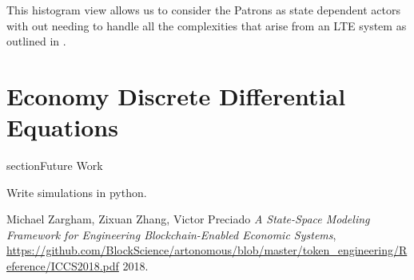 \documentclass[11pt]{amsart}
\begin{document}
This histogram view allows us to consider the Patrons as state dependent actors with out needing to handle all the complexities that arise from an LTE system as outlined in \cite{MZICCS18}.

\section{Economy Discrete Differential Equations}

section{Future Work} 

Write simulations in python.

  \begin{thebibliography}{1}

   Michael Zargham, Zixuan Zhang, Victor Preciado {\em A State-Space Modeling Framework for Engineering Blockchain-Enabled Economic Systems}, \url{https://github.com/BlockScience/artonomous/blob/master/token_engineering/Reference/ICCS2018.pdf}  2018.

  \end{thebibliography}
\end{document}

